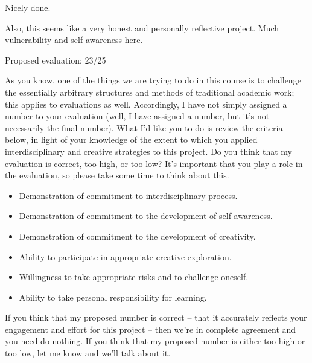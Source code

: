 \documentclass[letterpaper,10pt,DIV=9,headsepline]{scrreprt}
\begin{document}
Nicely done.

Also, this seems like a very honest and personally reflective project.
Much vulnerability and self-awareness here.



\bigskip
Proposed evaluation: 23/25

\bigskip
As you know, one of the things we are trying to do in this course is
to challenge the essentially arbitrary structures and methods of
traditional academic work; this applies to evaluations as well.
Accordingly, I have not simply assigned a number to your evaluation
(well, I have assigned a number, but it's not necessarily the final
number). What I'd like you to do is review the criteria below, in
light of your knowledge of the extent to which you applied
interdisciplinary and creative strategies to this project. Do you
think that my evaluation is correct, too high, or too low? It's
important that you play a role in the evaluation, so please take some
time to think about this.

\begin{itemize}
\item Demonstration of commitment to interdisciplinary process.
\item Demonstration of commitment to the development of self-awareness.
\item Demonstration of commitment to the development of creativity.
\item Ability to participate in appropriate creative exploration.
\item Willingness to take appropriate risks and to challenge oneself.
\item Ability to take personal responsibility for learning.
\end{itemize}

If you think that my proposed number is correct -- that it accurately
reflects your engagement and effort for this project -- then we're in
complete agreement and you need do nothing. If you think that my
proposed number is either too high or too low, let me know and we'll
talk about it.
\end{document}
